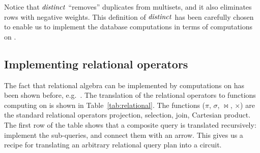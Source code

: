 Notice that $\mathit{distinct}$ ``removes'' duplicates from multisets, and it also eliminates
rows with negative weights.
This definition of $\mathit{distinct}$ has been carefully
chosen to enable us to implement the database computations
in terms of computations on \zrs.

%
%

\subsection{Implementing relational operators}\label{sec:relational-operators}

The fact that relational algebra can be implemented by computations on
\zrs has been shown before, e.g.~\cite{green-pods07}.  The translation
of the relational operators to functions computing on \zrs is shown in
Table~\ref{tab:relational}.  The functions ($\pi$, $\sigma$,
$\bowtie$, $\times$) are the standard relational operators projection,
selection, join, Cartesian product.  The first row of the table shows
that a composite query is translated recursively: implement the
sub-queries, and connect them with an arrow.  This gives us a recipe
for translating an arbitrary relational query plan into a circuit.

